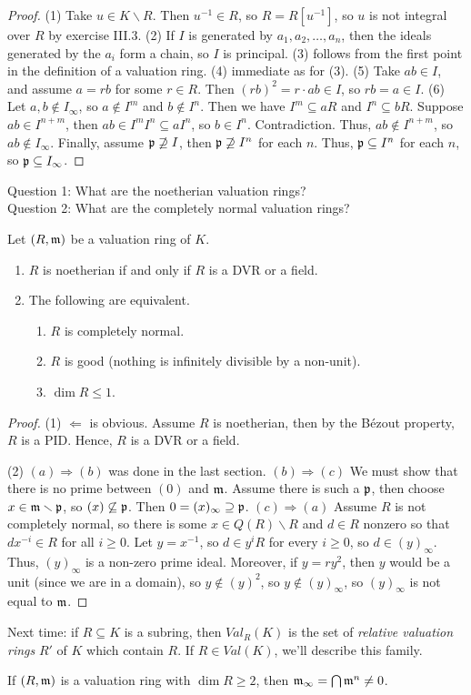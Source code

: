 \begin{proof}
  (1) Take $u\in K\smallsetminus R$. Then $u^{-1}\in R$, so $R=R[u^{-1}]$, so $u$ is not
  integral over $R$ by exercise III.3. (2) If $I$ is generated by $a_1, a_2, \dots, a_n$,
  then the ideals generated by the $a_i$ form a chain, so $I$ is principal. (3) follows
  from the first point in the definition of a valuation ring. (4) immediate
  as for (3). (5) Take $ab\in I$, and assume $a=rb$ for some $r\in R$. Then $(rb)^2=
  r\cdot ab\in I$, so $rb=a\in I$. (6) Let $a,b\not\in I_\infty$, so $a\not\in I^m$ and
  $b\not\in I^n$. Then  we have $I^m\subseteq aR$ and $I^n\subseteq bR$. Suppose $ab\in
  I^{n+m}$, then $ab\in I^m I^n\subseteq aI^n$, so $b\in I^n$. Contradiction. Thus,
  $ab\not\in I^{n+m}$, so $ab\not\in I_\infty$. Finally, assume $\mathfrak{p}\not\supseteq I$, then
  $\mathfrak{p}\not\supseteq I^n$ for each $n$. Thus, $\mathfrak{p}\subseteq I^n$ for each $n$, so
  $\mathfrak{p}\subseteq I_\infty$.
\end{proof}
\noindent
Question 1: What are the noetherian valuation rings?\\
Question 2: What are the completely normal valuation rings?\\
\begin{corollary}
  Let $(R,\mathfrak{m})$ be a valuation ring of $K$.
  \begin{enumerate}
    \item $R$ is noetherian if and only if $R$ is a DVR or a field.
    \item The following are equivalent.
    \begin{enumerate}
      \item $R$ is completely normal.
      \item $R$ is good (nothing is infinitely divisible by a non-unit).
      \item $\dim R\le 1$.
    \end{enumerate}
  \end{enumerate}
\end{corollary}
\begin{proof}
  (1) $\Leftarrow$ is obvious. Assume $R$ is noetherian, then by the B\'ezout property,
  $R$ is a PID. Hence, $R$ is a DVR or a field.

  (2) $(a)\Rightarrow(b)$ was done in the last section. $(b)\Rightarrow(c)$ We must show
  that there is no prime between $(0)$ and $\mathfrak{m}$. Assume there is such a $\mathfrak{p}$, then choose
  $x\in \mathfrak{m}\smallsetminus \mathfrak{p}$, so $(x)\not\subseteq \mathfrak{p}$. Then $0=(x)_\infty\supseteq \mathfrak{p}$.
  $(c)\Rightarrow(a)$ Assume $R$ is not completely normal, so there is some $x\in
  Q(R)\smallsetminus R$ and $d\in R$ nonzero so that $dx^{-i}\in R$ for all $i\ge 0$. Let
  $y=x^{-1}$, so $d\in y^i R$ for every $i\ge 0$, so $d\in (y)_\infty$. Thus,
  $(y)_\infty$ is a non-zero prime ideal. Moreover, if $y=ry^2$, then $y$ would be a unit
  (since we are in a domain), so $y\not\in (y)^2$, so $y\not\in (y)_\infty$, so
  $(y)_\infty$ is not equal to $\mathfrak{m}$.
\end{proof}
Next time: if $R\subseteq K$ is a subring, then $Val_R(K)$ is the set of \emph{relative
valuation rings} $R'$ of $K$ which contain $R$. If $R\in Val(K)$, we'll describe this
family.

\begin{corollary}
  If $(R,\mathfrak{m})$ is a valuation ring with $\dim R\ge 2$, then $\mathfrak{m}_\infty = \bigcap \mathfrak{m}^n \neq
  0$.
\end{corollary}
